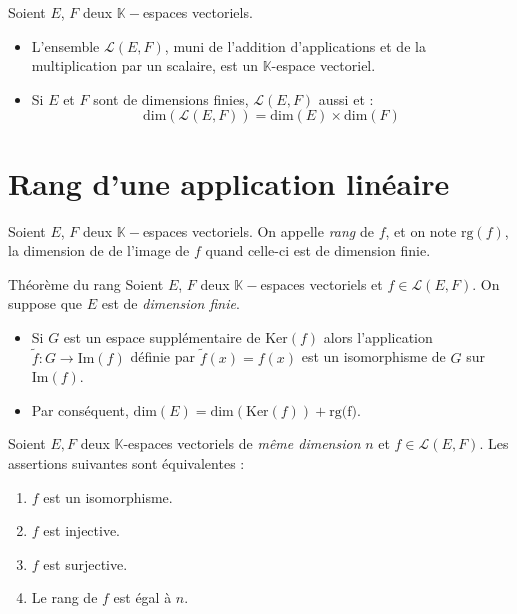 \documentclass[french,11pt,twoside]{VcCours}
\renewcommand{\trou}[1]{{\color{blue}#1}}
\begin{document}
\begin{Proposition}{} Soient $E$, $F$ deux $\mathbb{K}-$espaces vectoriels.

\begin{itemize}
\item L'ensemble $\mathcal{L}(E,F)$, muni de l'addition d'applications et de la multiplication par un scalaire, est un $\mathbb{K}$-espace vectoriel.
\item Si $E$ et $F$ sont de dimensions finies, $\mathcal{L}(E,F)$ aussi et :
$$ \textrm{dim}( \mathcal{L}(E,F)) = \textrm{dim}(E) \times \textrm{dim}(F)$$
\end{itemize}
\end{Proposition}

\section{Rang d'une application linéaire}

\begin{Definition}{} Soient $E$, $F$ deux $\mathbb{K}-$espaces vectoriels. On appelle \emph{rang} de $f$, et on note $\textrm{rg}(f)$, la dimension de de l'image de $f$ quand celle-ci est de dimension finie.
\end{Definition}

\begin{Theoreme}{Théorème du rang} Soient $E$, $F$ deux $\mathbb{K}-$espaces vectoriels et $f \in \mathcal{L}(E,F)$. On suppose que $E$ est de \emph{dimension finie}.

\begin{itemize}
\item Si $G$ est un espace supplémentaire de $\textrm{Ker}(f)$ alors l'application $\tilde{f} : G \rightarrow\textrm{Im}(f)$ définie par \newline $\tilde{f}(x)=f(x)$ est un isomorphisme de $G$ sur $\textrm{Im}(f)$.
\item Par conséquent, \trou{$\textrm{dim}(E) = \textrm{dim}(\textrm{Ker}(f)) + \textrm{rg(f)}$.}
\end{itemize}
\end{Theoreme}

\begin{Theoreme}{} Soient $E, F$ deux $\mathbb{K}$-espaces vectoriels de \emph{même dimension} $n$ et $f \in \mathcal{L}(E,F)$. Les assertions suivantes sont équivalentes :

\begin{enumerate}
\item $f$ est un isomorphisme.
\item \trou{$f$ est injective.}
\item \trou{$f$ est surjective.}
\item \trou{Le rang de $f$ est égal à $n$.}
\end{enumerate}
\end{Theoreme}
\end{document}

